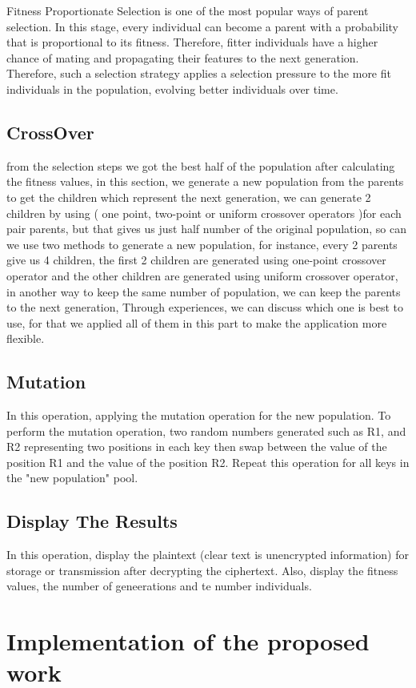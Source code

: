 Fitness Proportionate Selection is one of the most popular ways of parent selection. In this stage, every individual can become a parent with a probability that is proportional to its fitness. Therefore, fitter individuals have a higher chance of mating and propagating their features to the next generation. Therefore, such a selection strategy applies a selection pressure to the more fit individuals in the population, evolving better individuals over time.
\subsection{CrossOver}
from the selection steps we got the best half of the population after calculating the fitness values, in this section, we generate a new population from the parents to get the children which represent the next generation, we can generate 2 children by using ( one point, two-point or uniform crossover operators )for each pair parents, but that gives us just half number of the original population, so can we use two methods to generate a new population, for instance, every 2 parents give us 4 children, the first 2 children are generated using one-point crossover operator and the other children are generated using uniform crossover operator,
in another way to keep the same number of population, we can keep the parents to the next generation, Through experiences, we can discuss which one is best to use, for that we applied all of them in this part to make the application more flexible.
\subsection{Mutation}
In this operation, applying the mutation operation for the new population. To perform the mutation operation, two random numbers generated such as R1, and R2 representing two positions in each key then swap between the value of the position R1 and the value of the position R2. Repeat this operation for all keys in the "new population" pool.
\subsection{Display The Results}
In this operation, display the plaintext (clear text is unencrypted information) for storage or transmission after decrypting the ciphertext. Also, display  the fitness values, the number of geneerations and te number individuals.
\section{Implementation of the proposed work}
